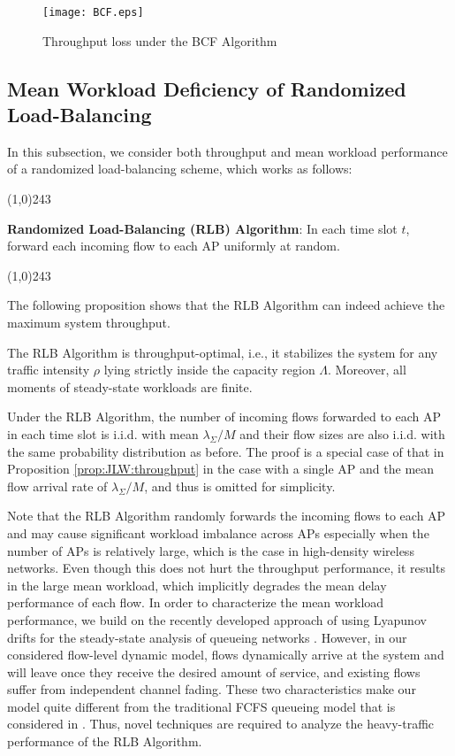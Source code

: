 \documentclass[10pt, conference, letterpaper]{IEEEtran} %
\begin{document}
\begin{figure}[htb!]
\vspace{-0.15in}
\begin{center}
\texttt{[image: BCF.eps]}
\caption{Throughput loss under the BCF Algorithm}
\label{fig:BCF}
\end{center}
\vspace{-0.2in}
\end{figure}

\subsection{Mean Workload Deficiency of Randomized Load-Balancing}

In this subsection, we consider both throughput and mean workload performance of a randomized load-balancing scheme, which works as follows:


\noindent\line(1,0){243}

\noindent\textbf{Randomized Load-Balancing (RLB) Algorithm}: In each time slot $t$, forward each incoming flow to each AP uniformly at random. 

\noindent\line(1,0){243}


The following proposition shows that the RLB Algorithm can indeed achieve the maximum system throughput.
\begin{proposition}
\label{prop:RLB:throughput}
The RLB Algorithm is throughput-optimal, i.e., it stabilizes the system for any traffic intensity $\rho$ lying strictly inside the capacity region $\Lambda$. Moreover, all moments of steady-state workloads are finite.
\end{proposition}
\begin{IEEEproof}
Under the RLB Algorithm, the number of incoming flows forwarded to each AP in each time slot is i.i.d. with mean $\lambda_{\Sigma}/M$ and their flow sizes are also i.i.d. with the same probability distribution as before. The proof is a special case of that in Proposition \ref{prop:JLW:throughput} in the case with a single AP and the mean flow arrival rate of $\lambda_{\Sigma}/M$, and thus is omitted for simplicity.
\end{IEEEproof}

Note that the RLB Algorithm randomly forwards the incoming flows to each AP and may cause significant workload imbalance across APs especially when the number of APs is relatively large, which is the case in high-density wireless networks. Even though this does not hurt the throughput performance, it results in the large mean workload, which implicitly degrades the mean delay performance of each flow. In order to characterize the mean workload performance, we build on the recently developed approach of using Lyapunov drifts for the steady-state analysis of queueing networks \cite{erysri12}. However, in our considered flow-level dynamic model, flows dynamically arrive at the system and will leave once they receive the desired amount of service, and existing flows suffer from independent channel fading. These two characteristics make our model quite different from the traditional FCFS queueing model that is considered in \cite{erysri12}. Thus, novel techniques are required to analyze the heavy-traffic performance of the RLB Algorithm.
\end{document}
